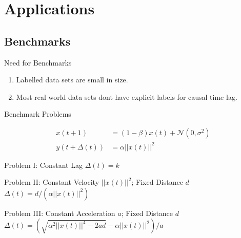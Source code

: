 \documentclass{beamer}
\begin{document}
\section{Applications}

\subsection{Benchmarks}

\begin{frame}{Need for Benchmarks}
\begin{enumerate}
\item Labelled data sets are small in size.
\newline
\item Most real world data sets dont have explicit labels for causal time lag.
\end{enumerate}
\end{frame}

\begin{frame}{Benchmark Problems}

\begin{align*}
 x(t+1) &= (1 - \beta) x(t) + \mathcal{N}(0, \sigma^2) \\
 y(t+\Delta(t)) &= \alpha ||x(t)||^2
\end{align*}

\begin{block}{Problem I: Constant Lag}
$\Delta(t) = k$
\end{block}

\begin{block}{Problem II: Constant Velocity $||x(t)||^2$; Fixed Distance $d$}
$\Delta(t) = d/(\alpha ||x(t)||^2)$
\end{block}

\begin{block}{Problem III: Constant Acceleration $a$; Fixed Distance $d$}
$\Delta(t) = (\sqrt{\alpha^2||x(t)||^4 - 2ad} - \alpha||x(t)||^2)/a$
\end{block}

\end{frame}
\end{document}
